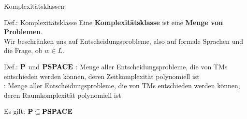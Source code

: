 \begin{frame}{Komplexitätsklassen}
    \begin{block}{Def.: Komplexitätsklasse}
        Eine \textbf{Komplexitätsklasse} ist eine \textbf{Menge von Problemen}.\\
        Wir beschränken uns auf Entscheidungsprobleme, also auf formale Sprachen und die Frage, ob $w \in L$.
    \end{block}

    \begin{block}{Def.: $\text{\bfseries P}$ und $\text{\bfseries PSPACE}$}
        \Pclass: Menge aller Entscheidungsprobleme, die von TMs entschieden werden können, deren Zeitkomplexität polynomiell ist\\[1ex]
        \PSPACE: Menge aller Entscheidungsprobleme, die von TMs entschieden werden können, deren Raumkomplexität polynomiell ist 
    \end{block}

    Es gilt: $\text{\bfseries P} \subseteq \text{\bfseries PSPACE}$
\end{frame}